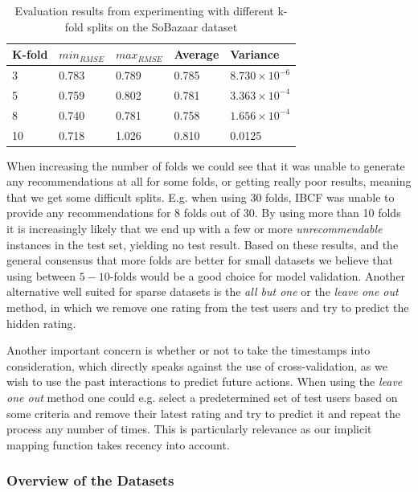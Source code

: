 \begin{table}[H]
\centering
\begin{tabular}{l l l l l }
\toprule
K-fold & 	$min_{RMSE}$ 	&	$max_{RMSE}$ 	& Average 	& Variance 					\\ \midrule
3	   & 	0.783 			& 	0.789 			& 0.785 	& $8.730 \times 10^{-6}$	\\ 
5	   & 	0.759			& 	0.802 			& 0.781 	& $3.363 \times 10^{-4}$ 	\\ 
8	   & 	0.740			& 	0.781			& 0.758 	& $1.656 \times 10^{-4}$ 	\\ 
10	   & 	0.718 			& 	1.026			& 0.810  	& 0.0125					\\
\bottomrule
\end{tabular}
\caption{Evaluation results from experimenting with different k-fold splits on the SoBazaar dataset}
\end{table}


When increasing the number of folds we could see that it was unable to generate
any recommendations at all for some folds, or getting really poor results, meaning
that we get some difficult splits. E.g. when using 30 folds, IBCF was unable to
provide any recommendations for 8 folds out of 30. By using more than 10 folds
it is increasingly likely that we end up with a few or more \emph{unrecommendable}
instances in the test set, yielding no test result. Based on these results,
and the general consensus that more folds are better for small datasets we
believe that using between $5-10$-folds would be a good choice for model validation.
Another alternative well suited for sparse datasets is the \emph{all but one} or the
\emph{leave one out} method, in which we remove one rating from the test users
and try to predict the hidden rating.

Another important concern is whether or not to take the timestamps into consideration,
which directly speaks against the use of cross-validation, as we wish to use the past
interactions to predict future actions. When using the \emph{leave one out} method one
could e.g. select a predetermined set of test users based on some criteria and remove
their latest rating and try to predict it and repeat the process any number of times.
This is particularly relevance as our implicit mapping function takes recency into account.


\subsubsection{Overview of the Datasets}

